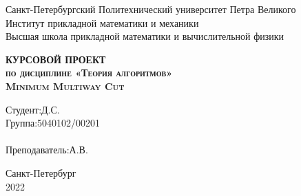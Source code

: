 \begin{titlepage}
\newpage

\begin{center}
Санкт-Петербургский Политехнический университет Петра Великого \\
Институт прикладной математики и механики \\
Высшая школа прикладной математики и вычислительной физики
\end{center}

\vspace{8em}

\vspace{2em}

\begin{center}
\textsc{\textbf{КУРСОВОЙ ПРОЕКТ\\по дисциплине «Теория алгоритмов»\\Minimum Multiway Cut}}
\end{center}

\vspace{6em}

\newbox{\lbox}
\newlength{\maxl}
\setlength{\maxl}{\wd\lbox}
\hfill\parbox{11cm}{
\hspace*{5cm}\hspace*{-5cm}Студент: Д.С.\\
\hspace*{5cm}\hspace*{-5cm}Группа:\hfill5040102/00201\\
\\
\hspace*{5cm}\hspace*{-5cm}Преподаватель: А.В.\\
}


\vspace{\fill}

\begin{center}
Санкт-Петербург \\2022
\end{center}

\end{titlepage}